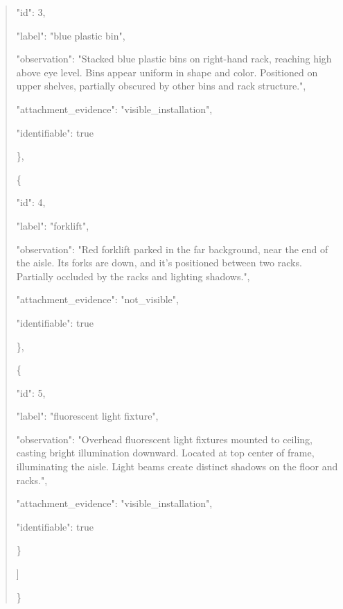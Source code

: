 \documentclass[10pt,a4paper]{article}
\begin{document}
\begin{quote}
      "id":\allowbreak{} 3,\allowbreak{}\par
      "label":\allowbreak{} "blue plastic bin",\allowbreak{}\par
      "observation":\allowbreak{} "Stacked blue plastic bins on right-hand rack,\allowbreak{} reaching high above eye level. Bins appear uniform in shape and color. Positioned on upper shelves,\allowbreak{} partially obscured by other bins and rack structure.",\allowbreak{}\par
      "attachment\_evidence":\allowbreak{} "visible\_installation",\allowbreak{}\par
      "identifiable":\allowbreak{} true\par
    \},\allowbreak{}\par
    \{\par
      "id":\allowbreak{} 4,\allowbreak{}\par
      "label":\allowbreak{} "forklift",\allowbreak{}\par
      "observation":\allowbreak{} "Red forklift parked in the far background,\allowbreak{} near the end of the aisle. Its forks are down,\allowbreak{} and it's positioned between two racks. Partially occluded by the racks and lighting shadows.",\allowbreak{}\par
      "attachment\_evidence":\allowbreak{} "not\_visible",\allowbreak{}\par
      "identifiable":\allowbreak{} true\par
    \},\allowbreak{}\par
    \{\par
      "id":\allowbreak{} 5,\allowbreak{}\par
      "label":\allowbreak{} "fluorescent light fixture",\allowbreak{}\par
      "observation":\allowbreak{} "Overhead fluorescent light fixtures mounted to ceiling,\allowbreak{} casting bright illumination downward. Located at top center of frame,\allowbreak{} illuminating the aisle. Light beams create distinct shadows on the floor and racks.",\allowbreak{}\par
      "attachment\_evidence":\allowbreak{} "visible\_installation",\allowbreak{}\par
      "identifiable":\allowbreak{} true\par
    \}\par
  ]\par
\}
\end{quote}
\end{document}

